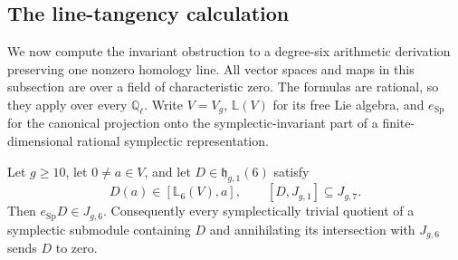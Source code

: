 \subsection{The line-tangency calculation}
\label{subsec:geometric-polynomial}

We now compute the invariant obstruction to a degree-six
arithmetic derivation preserving one nonzero homology line.
All vector spaces and maps in this subsection are over a
field of characteristic zero. The formulas are rational,
so they apply over every $\mathbb Q_\ell$.
Write $V=V_g$, $\mathbb L(V)$ for its free Lie algebra, and
$e_{\operatorname{Sp}}$ for the canonical projection onto
the symplectic-invariant part of a finite-dimensional
rational symplectic representation.

\begin{lemma}\label{lem:geometric-line-tangency}
Let $g\geq10$, let $0\ne a\in V$, and let
$D\in\mathfrak h_{g,1}(6)$ satisfy
\[
 D(a)\in[\mathbb L_6(V),a],\qquad [D,J_{g,1}]\subseteq J_{g,7}.
\]
Then $e_{\operatorname{Sp}}D\in J_{g,6}$.
Consequently every symplectically trivial quotient of a
symplectic submodule containing $D$ and annihilating its
intersection with $J_{g,6}$ sends $D$ to zero.
\end{lemma}

